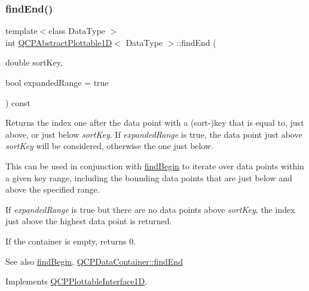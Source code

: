 \subsubsection{\texorpdfstring{findEnd()}{findEnd()}}
{\footnotesize\ttfamily template$<$class Data\+Type $>$ \\
int \mbox{\hyperlink{class_q_c_p_abstract_plottable1_d}{Q\+C\+P\+Abstract\+Plottable1D}}$<$ Data\+Type $>$\+::find\+End (\begin{DoxyParamCaption}\item[{double}]{sort\+Key,  }\item[{bool}]{expanded\+Range = {\ttfamily true} }\end{DoxyParamCaption}) const\hspace{0.3cm}{\ttfamily [virtual]}}





Returns the index one after the data point with a (sort-\/)key that is equal to, just above, or just below {\itshape sort\+Key}. If {\itshape expanded\+Range} is true, the data point just above {\itshape sort\+Key} will be considered, otherwise the one just below.

This can be used in conjunction with \mbox{\hyperlink{class_q_c_p_abstract_plottable1_d_ad0b46d25cde3d035b180fb8f10c056e6}{find\+Begin}} to iterate over data points within a given key range, including the bounding data points that are just below and above the specified range.

If {\itshape expanded\+Range} is true but there are no data points above {\itshape sort\+Key}, the index just above the highest data point is returned.

If the container is empty, returns 0.

\begin{DoxySeeAlso}{See also}
\mbox{\hyperlink{class_q_c_p_abstract_plottable1_d_ad0b46d25cde3d035b180fb8f10c056e6}{find\+Begin}}, \mbox{\hyperlink{class_q_c_p_data_container_afb8b8f23cc2b7234a793a25ce79fe48f}{Q\+C\+P\+Data\+Container\+::find\+End}} 
\end{DoxySeeAlso}


Implements \mbox{\hyperlink{class_q_c_p_plottable_interface1_d_a5deced1016bc55a41a2339619045b295}{Q\+C\+P\+Plottable\+Interface1D}}.

\mbox{\label{class_q_c_p_abstract_plottable1_d_ae890e62ce403c54f575c73b9529f1af8}} 
